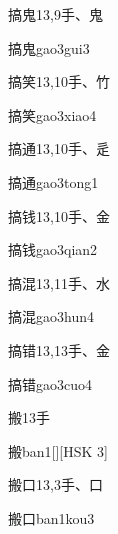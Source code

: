 \begin{entry}{搞鬼}{13,9}{⼿、⿁}
  \begin{phonetics}{搞鬼}{gao3gui3}
  \end{phonetics}
\end{entry}

\begin{entry}{搞笑}{13,10}{⼿、⽵}
  \begin{phonetics}{搞笑}{gao3xiao4}
  \end{phonetics}
\end{entry}

\begin{entry}{搞通}{13,10}{⼿、⾡}
  \begin{phonetics}{搞通}{gao3tong1}
  \end{phonetics}
\end{entry}

\begin{entry}{搞钱}{13,10}{⼿、⾦}
  \begin{phonetics}{搞钱}{gao3qian2}
  \end{phonetics}
\end{entry}

\begin{entry}{搞混}{13,11}{⼿、⽔}
  \begin{phonetics}{搞混}{gao3hun4}
  \end{phonetics}
\end{entry}

\begin{entry}{搞错}{13,13}{⼿、⾦}
  \begin{phonetics}{搞错}{gao3cuo4}
  \end{phonetics}
\end{entry}

\begin{entry}{搬}{13}{⼿}
  \begin{phonetics}{搬}{ban1}[][HSK 3]
  \end{phonetics}
\end{entry}

\begin{entry}{搬口}{13,3}{⼿、⼝}
  \begin{phonetics}{搬口}{ban1kou3}
  \end{phonetics}
\end{entry}

